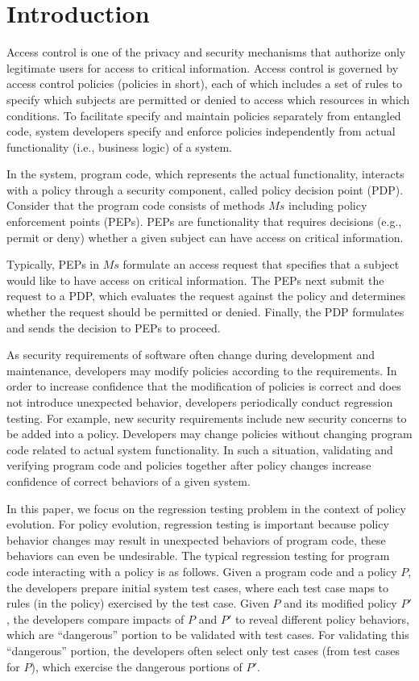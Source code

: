 \section{Introduction} \label{sec:introduction}
 
Access control is one of the privacy and security mechanisms that authorize only legitimate users for access to critical information. 
Access control is governed by access control policies (policies in short), each of which includes a set of rules to specify 
which subjects are permitted or denied to access which resources in which conditions.
To facilitate specify and maintain policies separately from entangled code, system developers specify and enforce policies independently from actual functionality (i.e., business logic) of a system.

In the system, program code, which represents the actual functionality,
interacts with a policy through a security component, called policy decision point (PDP).
Consider that the program code 
consists of methods $Ms$ including policy enforcement points (PEPs).
PEPs are functionality that requires decisions (e.g., permit or deny) whether a given subject can have access on critical information.

Typically, PEPs in $Ms$ formulate an access request that specifies that a subject would like to have access on 
critical information. The PEPs next submit the request to a PDP, which evaluates the request against the policy
and determines whether the request should be permitted or denied. Finally, the PDP formulates and sends the
decision to PEPs to proceed.

As security requirements of software often change during development and maintenance,
developers may modify policies according to the requirements.
In order to increase confidence that the modification of policies is correct and
does not introduce unexpected behavior, developers periodically conduct regression testing.
For example, new security requirements include new security concerns to be added into a policy.
Developers may change policies without changing program code related to actual system functionality.
In such a situation, validating and verifying program code and policies together after policy changes
increase confidence of correct behaviors of a given system.


In this paper, we focus on the regression testing problem in the context of policy evolution.
For policy evolution, regression testing is important because policy behavior changes may
result in unexpected behaviors of program code, these behaviors can even be undesirable.
The typical regression testing for program code interacting with a policy is as follows.
Given a program code and a policy $P$, the developers prepare initial system test cases, where
each test case maps to rules (in the policy) exercised by the test case. Given $P$ and its modified
policy $P'$, the developers compare impacts of $P$ and $P'$ to
reveal different policy behaviors, which are ``dangerous'' portion to be validated with
test cases. For validating this ``dangerous'' portion, the developers often select only test cases (from test cases for $P$), which exercise the dangerous
portions of $P'$.



